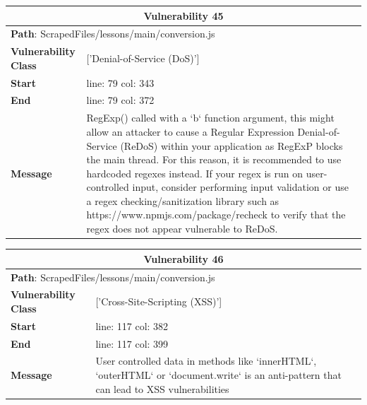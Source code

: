 \documentclass[12pt]{article}
\begin{document}
\vspace{0.7cm}
\FloatBarrier
\begin{table}[!h]
\centering
\renewcommand{\arraystretch}{1.3}
\begin{tabular}{|l|p{10cm}|}
\hline
\multicolumn{2}{|c|}{\textbf{Vulnerability 45}} \\
\hline
\multicolumn{2}{|l|}{\textbf{Path}: ScrapedFiles/lessons/main/conversion.js} \\
\hline
\textbf{Vulnerability Class} & ['Denial-of-Service (DoS)'] \\
\hline
\textbf{Start} & line: 79 \quad col: 343 \\
\hline
\textbf{End} & line: 79 \quad col: 372 \\
\hline
\textbf{Message} & RegExp() called with a `b` function argument, this might allow an attacker to cause a Regular Expression Denial-of-Service (ReDoS) within your application as RegExP blocks the main thread. For this reason, it is recommended to use hardcoded regexes instead. If your regex is run on user-controlled input, consider performing input validation or use a regex checking/sanitization library such as https://www.npmjs.com/package/recheck to verify that the regex does not appear vulnerable to ReDoS. \\
\hline
\end{tabular}
\end{table}
\vspace{0.7cm}
\FloatBarrier
\begin{table}[!h]
\centering
\renewcommand{\arraystretch}{1.3}
\begin{tabular}{|l|p{10cm}|}
\hline
\multicolumn{2}{|c|}{\textbf{Vulnerability 46}} \\
\hline
\multicolumn{2}{|l|}{\textbf{Path}: ScrapedFiles/lessons/main/conversion.js} \\
\hline
\textbf{Vulnerability Class} & ['Cross-Site-Scripting (XSS)'] \\
\hline
\textbf{Start} & line: 117 \quad col: 382 \\
\hline
\textbf{End} & line: 117 \quad col: 399 \\
\hline
\textbf{Message} & User controlled data in methods like `innerHTML`, `outerHTML` or `document.write` is an anti-pattern that can lead to XSS vulnerabilities \\
\hline
\end{tabular}
\end{table}
\vspace{0.7cm}
\FloatBarrier
\end{document}
